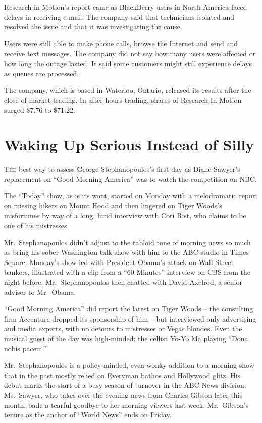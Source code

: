 ﻿\documentclass[12pt]{article}
\begin{document}
Research in Motion's report came as BlackBerry users in North America faced delays in receiving
e-mail. The company said that technicians isolated and resolved the issue and that it was
investigating the cause.

Users were still able to make phone calls, browse the Internet and send and receive text messages.
The company did not say how many users were affected or how long the outage lasted. It said some
customers might still experience delays as queues are processed.

The company, which is based in Waterloo, Ontario, released its results after the close of market
trading. In after-hours trading, shares of Research In Motion surged \$7.76 to \$71.22.

\section{Waking Up Serious Instead of Silly}

\lettrine{T}{he} best way to assess George Stephanopoulos's first day as
Diane Sawyer's replacement on ``Good Morning America'' was to watch the competition on NBC.

The ``Today'' show, as is its wont, started on Monday with a melodramatic report on missing hikers
on Mount Hood and then lingered on Tiger Woods's misfortunes by way of a long, lurid interview with
Cori Rist, who claims to be one of his mistresses.

Mr.~Stephanopoulos didn't adjust to the tabloid tone of morning news so much as bring his sober
Washington talk show with him to the ABC studio in Times Square. Monday's show led with President
Obama's attack on Wall Street bankers, illustrated with a clip from a ``60 Minutes'' interview on
CBS from the night before. Mr.~Stephanopoulos then chatted with David Axelrod, a senior adviser to
Mr.~Obama.

``Good Morning America'' did report the latest on Tiger Woods -- the consulting firm Accenture
dropped its sponsorship of him -- but interviewed only advertising and media experts, with no
detours to mistresses or Vegas blondes. Even the musical guest of the day was high-minded: the
cellist Yo-Yo Ma playing ``Dona nobis pacem.''

Mr.~Stephanopoulos is a policy-minded, even wonky addition to a morning show that in the past mostly
relied on Everyman bathos and Hollywood glitz. His debut marks the start of a busy season of
turnover in the ABC News division: Ms.~Sawyer, who takes over the evening news from Charles Gibson
later this month, bade a tearful goodbye to her morning viewers last week. Mr.~Gibson's tenure as
the anchor of ``World News'' ends on Friday.
\end{document}
